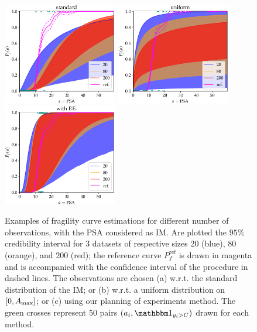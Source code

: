 \begin{figure}[h]
    \centering%
    \includegraphics[width=5cm]{figures/low-doe/curves_standard.pdf}%
    \includegraphics[width=5cm]{figures/low-doe/curves_unif.pdf}%
    \includegraphics[width=5cm]{figures/low-doe/curves_PE.pdf}\\
    \caption{Examples of fragility curve estimations for different number of observations, with the PSA considered as IM. Are plotted the $95\%$ credibility interval for 3 datasets of respective sizes 20 (blue), 80 (orange), and 200 (red); the reference curve $P_f^{\mathrm{ref}}$ is drawn in magenta and is accompanied with the confidence interval of the procedure in dashed lines.
    The observations are chosen (a) w.r.t.{ }the standard distribution of the IM; 
    {or (b) w.r.t.{ }a uniform distribution on $[0,A_{\rm max}]$};
    or (c) using our planning of experiments method. The green crosses represent 50 pairs $(a_i,\indic_{y_i>C})$ drawn for each method.}
    \label{lowdoe:fig:examples}
\end{figure}



